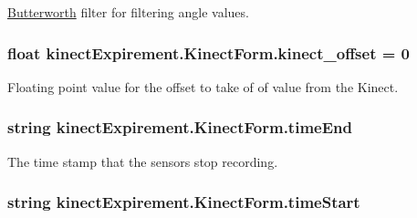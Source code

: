 \hyperlink{classkinect_expirement_1_1_butterworth}{Butterworth} filter for filtering angle values. 

\subsubsection[{\texorpdfstring{kinect\+\_\+offset}{kinect_offset}}]{\setlength{\rightskip}{0pt plus 5cm}float kinect\+Expirement.\+Kinect\+Form.\+kinect\+\_\+offset = 0}\hypertarget{classkinect_expirement_1_1_kinect_form_a97a0dd9256e1093328fafccaca672398}{}\label{classkinect_expirement_1_1_kinect_form_a97a0dd9256e1093328fafccaca672398}


Floating point value for the offset to take of of value from the Kinect. 

\subsubsection[{\texorpdfstring{time\+End}{timeEnd}}]{\setlength{\rightskip}{0pt plus 5cm}string kinect\+Expirement.\+Kinect\+Form.\+time\+End}\hypertarget{classkinect_expirement_1_1_kinect_form_ae6cd686e49bc40b85ce2fdb1a053be6a}{}\label{classkinect_expirement_1_1_kinect_form_ae6cd686e49bc40b85ce2fdb1a053be6a}


The time stamp that the sensors stop recording. 

\subsubsection[{\texorpdfstring{time\+Start}{timeStart}}]{\setlength{\rightskip}{0pt plus 5cm}string kinect\+Expirement.\+Kinect\+Form.\+time\+Start}\hypertarget{classkinect_expirement_1_1_kinect_form_af26c689e66a18aa21dfb11a8ec01a6dd}{}\label{classkinect_expirement_1_1_kinect_form_af26c689e66a18aa21dfb11a8ec01a6dd}


